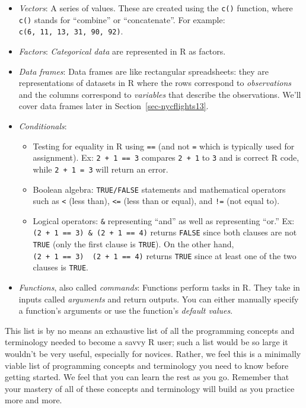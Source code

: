 \documentclass[
  letterpaper,
  DIV=11,
  numbers=noendperiod]{scrreprt}
\providecommand{\tightlist}{%
  \setlength{\itemsep}{0pt}\setlength{\parskip}{0pt}}\usepackage{longtable,booktabs,array}
\theoremstyle{definition}
\theoremstyle{remark}
\begin{document}
\begin{itemize}
\item
  \emph{Vectors}: A series of values. These are created using the
  \texttt{c()} function, where \texttt{c()} stands for ``combine'' or
  ``concatenate''. For example: \texttt{c(6,\ 11,\ 13,\ 31,\ 90,\ 92)}.
\item
  \emph{Factors}: \emph{Categorical data} are represented in R as
  factors.
\item
  \emph{Data frames}: Data frames are like rectangular spreadsheets:
  they are representations of datasets in R where the rows correspond to
  \emph{observations} and the columns correspond to \emph{variables}
  that describe the observations.  We'll cover data
  frames later in Section~\ref{sec-nycflights13}.
\item
  \emph{Conditionals}:

  \begin{itemize}
  \tightlist
  \item
    Testing for equality in R using \texttt{==} (and not \texttt{=}
    which is typically used for assignment). Ex: \texttt{2\ +\ 1\ ==\ 3}
    compares \texttt{2\ +\ 1} to \texttt{3} and is correct R code, while
    \texttt{2\ +\ 1\ =\ 3} will return an error.
  \item
    Boolean algebra: \texttt{TRUE/FALSE} statements and mathematical
    operators such as \texttt{\textless{}} (less than),
    \texttt{\textless{}=} (less than or equal), and \texttt{!=} (not
    equal to).
  \item
    Logical operators: \texttt{\&} representing ``and'' as well as
    \texttt{\textbar{}} representing ``or.'' Ex:
    \texttt{(2\ +\ 1\ ==\ 3)\ \&\ (2\ +\ 1\ ==\ 4)} returns
    \texttt{FALSE} since both clauses are not \texttt{TRUE} (only the
    first clause is \texttt{TRUE}). On the other hand,
    \texttt{(2\ +\ 1\ ==\ 3)\ \textbar{}\ (2\ +\ 1\ ==\ 4)} returns
    \texttt{TRUE} since at least one of the two clauses is
    \texttt{TRUE}.
  \end{itemize}
\item
  \emph{Functions}, also called \emph{commands}: Functions perform tasks
  in R. They take in inputs called \emph{arguments} and return outputs.
  You can either manually specify a function's arguments or use the
  function's \emph{default values}.
\end{itemize}

This list is by no means an exhaustive list of all the programming
concepts and terminology needed to become a savvy R user; such a list
would be so large it wouldn't be very useful, especially for novices.
Rather, we feel this is a minimally viable list of programming concepts
and terminology you need to know before getting started. We feel that
you can learn the rest as you go. Remember that your mastery of all of
these concepts and terminology will build as you practice more and more.
\end{document}
